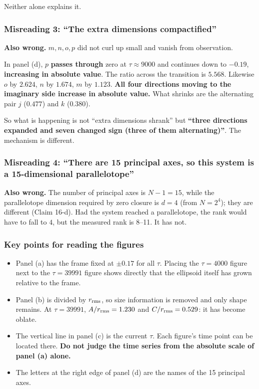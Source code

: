 \documentclass[
  10pt,
]{article}
\providecommand{\tightlist}{%
  \setlength{\itemsep}{0pt}\setlength{\parskip}{0pt}}
\begin{document}
Neither alone explains it.

\subsubsection{Misreading 3: ``The extra dimensions
compactified''}\label{misreading-3-the-extra-dimensions-compactified}

\textbf{Also wrong.} \(m,n,o,p\) did not curl up small and vanish from
observation.

In panel (d), \(p\) \textbf{passes through} zero at \(\tau\approx9000\)
and continues down to \(-0.19\), \textbf{increasing in absolute value}.
The ratio across the transition is \(5.568\). Likewise \(o\) by
\(2.624\), \(n\) by \(1.674\), \(m\) by \(1.123\). \textbf{All four
directions moving to the imaginary side increase in absolute value.}
What shrinks are the alternating pair \(j\) (\(0.477\)) and \(k\)
(\(0.380\)).

So what is happening is not ``extra dimensions shrank'' but
\textbf{``three directions expanded and seven changed sign (three of
them alternating)''}. The mechanism is different.

\subsubsection{Misreading 4: ``There are 15 principal axes, so this
system is a 15-dimensional
parallelotope''}\label{misreading-4-there-are-15-principal-axes-so-this-system-is-a-15-dimensional-parallelotope}

\textbf{Also wrong.} The number of principal axes is \(N-1 = 15\), while
the parallelotope dimension required by zero closure is \(d=4\) (from
\(N=2^4\)); they are different (Claim 16-d). Had the system reached a
parallelotope, the rank would have to fall to \(4\), but the measured
rank is 8--11. It has not.

\subsubsection{Key points for reading the
figures}\label{key-points-for-reading-the-figures}

\begin{itemize}
\tightlist
\item
  Panel (a) has the frame fixed at \(\pm0.17\) for all \(\tau\). Placing
  the \(\tau=4000\) figure next to the \(\tau=39991\) figure shows
  directly that the ellipsoid itself has grown relative to the frame.
\item
  Panel (b) is divided by \(r_{\rm rms}\), so size information is
  removed and only shape remains. At \(\tau=39991\),
  \(A/r_{\rm rms}=1.230\) and \(C/r_{\rm rms}=0.529\): it has become
  oblate.
\item
  The vertical line in panel (c) is the current \(\tau\). Each figure's
  time point can be located there. \textbf{Do not judge the time series
  from the absolute scale of panel (a) alone.}
\item
  The letters at the right edge of panel (d) are the names of the 15
  principal axes.
\end{itemize}
\end{document}
